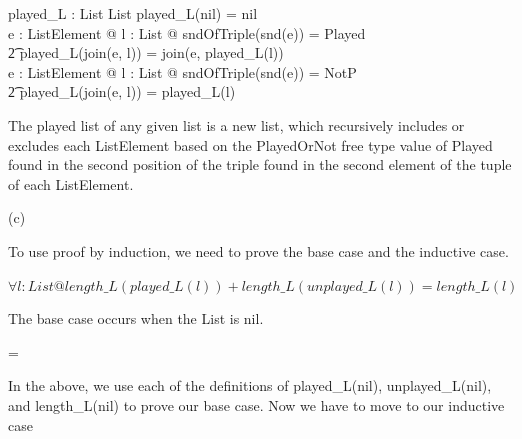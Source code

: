 \documentclass[a4paper,10pt,fleqn]{article}
\begin{document}
\bigskip

\begin{axdef}
played\_L : List \fun List
\where
played\_L(nil) = nil \\
\forall e : ListElement @ \forall l : List @ sndOfTriple(snd(e)) = Played \implies \\
\t2 played\_L(join(e, l)) = join(e, played\_L(l)) \\
\forall e : ListElement @ \forall l : List @ sndOfTriple(snd(e)) = NotP \implies \\
\t2 played\_L(join(e, l)) = played\_L(l)
\end{axdef}

\noindent The played list of any given list is a new list, which recursively includes or excludes each ListElement based on the PlayedOrNot free type value of Played found in the second position of the triple found in the second element of the tuple of each ListElement. 

\bigskip

\setlength{\leftskip}{0pt}
\medskip

\noindent\hspace*{\parindent}(c)

\setlength{\leftskip}{\dimexpr\parindent+2em\relax}
\noindent To use proof by induction, we need to prove the base case and the inductive case. 

\bigskip


\bigskip

\setlength{\leftskip}{\dimexpr\parindent+2em\relax}
\noindent
$\forall l : List @ length\_L(played\_L(l)) + length\_L(unplayed\_L(l)) = length\_L(l)$


\noindent The base case occurs when the List is nil.

\bigskip

\savedleftskip=\leftskip
\noindent
{}
\bigskip

\noindent In the above, we use each of the definitions of played\_L(nil), unplayed\_L(nil), and length\_L(nil) to prove our base case.  Now we have to move to our inductive case 
\end{document}
